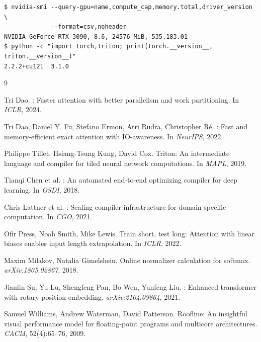 \documentclass[12pt]{article}
\begin{document}
\begin{lstlisting}[style=terminal]
$ nvidia-smi --query-gpu=name,compute_cap,memory.total,driver_version \
             --format=csv,noheader
NVIDIA GeForce RTX 3090, 8.6, 24576 MiB, 535.183.01
$ python -c "import torch,triton; print(torch.__version__, triton.__version__)"
2.2.2+cu121  3.1.0
\end{lstlisting}


\begin{thebibliography}{9}

  Tri Dao.
  : Faster attention with better parallelism and
    work partitioning.
  \newblock In \emph{ICLR}, 2024.

  Tri Dao, Daniel Y. Fu, Stefano Ermon, Atri Rudra, Christopher R\'{e}.
  \newblock {FlashAttention}: Fast and memory-efficient exact attention with
    IO-awareness.
  \newblock In \emph{NeurIPS}, 2022.

  Philippe Tillet, Hsiang-Tsung Kung, David Cox.
  \newblock Triton: An intermediate language and compiler for tiled neural
    network computations.
  \newblock In \emph{MAPL}, 2019.

  Tianqi Chen et al.
  : An automated end-to-end optimizing compiler for deep
    learning.
  \newblock In \emph{OSDI}, 2018.

  Chris Lattner et al.
  : Scaling compiler infrastructure for domain specific
    computation.
  \newblock In \emph{CGO}, 2021.

  Ofir Press, Noah Smith, Mike Lewis.
  \newblock Train short, test long: Attention with linear biases enables input
    length extrapolation.
  \newblock In \emph{ICLR}, 2022.

  Maxim Milakov, Natalia Gimelshein.
  \newblock Online normalizer calculation for softmax.
  \newblock \emph{arXiv:1805.02867}, 2018.

  Jianlin Su, Yu Lu, Shengfeng Pan, Bo Wen, Yunfeng Liu.
  : Enhanced transformer with rotary position embedding.
  \newblock \emph{arXiv:2104.09864}, 2021.

  Samuel Williams, Andrew Waterman, David Patterson.
  \newblock Roofline: An insightful visual performance model for floating-point
    programs and multicore architectures.
  \newblock \emph{CACM}, 52(4):65--76, 2009.

\end{thebibliography}
\end{document}
